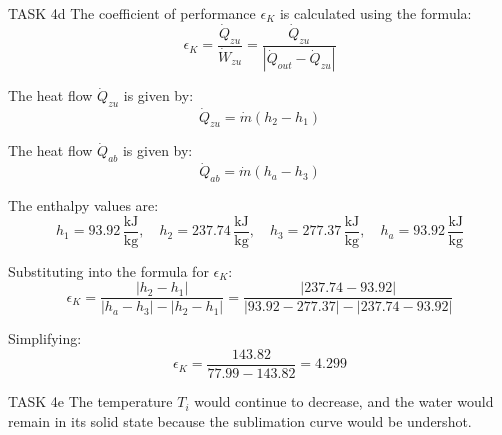 TASK 4d  
The coefficient of performance \( \epsilon_K \) is calculated using the formula:  
\[
\epsilon_K = \frac{\dot{Q}_{zu}}{\dot{W}_{zu}} = \frac{\dot{Q}_{zu}}{|\dot{Q}_{out} - \dot{Q}_{zu}|}
\]  

The heat flow \( \dot{Q}_{zu} \) is given by:  
\[
\dot{Q}_{zu} = \dot{m} (h_2 - h_1)
\]  

The heat flow \( \dot{Q}_{ab} \) is given by:  
\[
\dot{Q}_{ab} = \dot{m} (h_a - h_3)
\]  

The enthalpy values are:  
\[
h_1 = 93.92 \, \frac{\text{kJ}}{\text{kg}}, \quad h_2 = 237.74 \, \frac{\text{kJ}}{\text{kg}}, \quad h_3 = 277.37 \, \frac{\text{kJ}}{\text{kg}}, \quad h_a = 93.92 \, \frac{\text{kJ}}{\text{kg}}
\]  

Substituting into the formula for \( \epsilon_K \):  
\[
\epsilon_K = \frac{|h_2 - h_1|}{|h_a - h_3| - |h_2 - h_1|} = \frac{|237.74 - 93.92|}{|93.92 - 277.37| - |237.74 - 93.92|}
\]  

Simplifying:  
\[
\epsilon_K = \frac{143.82}{77.99 - 143.82} = 4.299
\]  

TASK 4e  
The temperature \( T_i \) would continue to decrease, and the water would remain in its solid state because the sublimation curve would be undershot.